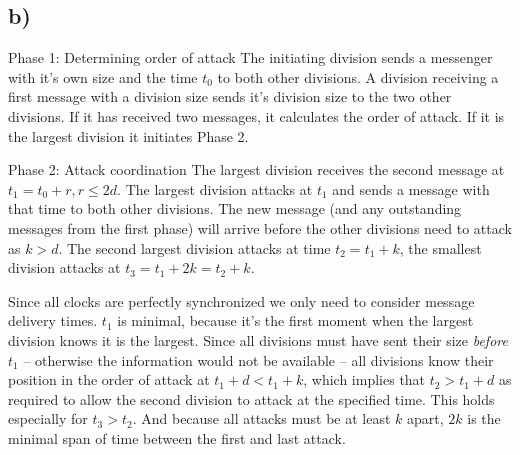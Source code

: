 \documentclass{scrartcl}
\begin{document}
\subsection*{b)}
\par{Phase 1: Determining order of attack}
The initiating division sends a messenger with it's own size and the time \(t_0\) to both other divisions.
A division receiving a first message with a division size sends it's division size to the two other divisions.
If it has received two messages, it calculates the order of attack.
If it is the largest division it initiates Phase 2.
\par{Phase 2: Attack coordination}
The largest division receives the second message at \(t_1 = t_0 + r, r \leq 2d\).
The largest division attacks at \(t_1\) and sends a message with that time to both other divisions.
The new message (and any outstanding messages from the first phase) will arrive before the other divisions need to attack as \(k > d\).
The second largest division attacks at time \(t_2 = t_1 + k\), the smallest division attacks at \(t_3 = t_1 + 2k = t_2 + k\).

Since all clocks are perfectly synchronized we only need to consider message delivery times.
\(t_1\) is minimal, because it's the first moment when the largest division knows it is the largest.
Since all divisions must have sent their size \emph{before} \(t_1\) -- otherwise the information would not be available -- all divisions know their position in the order of attack at \(t_1 + d < t_1 + k\), which implies that \(t_2 > t_1 + d\) as required to allow the second division to attack at the specified time.
This holds especially for \(t_3 > t_2\).
And because all attacks must be at least \(k\) apart, \(2k\) is the minimal span of time between the first and last attack.
\end{document}
